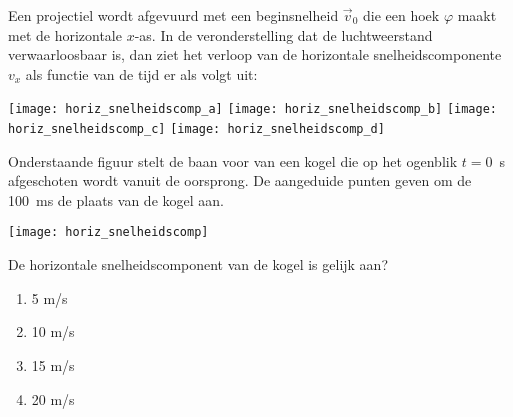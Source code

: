 \begin{exercise} Een projectiel wordt afgevuurd met een beginsnelheid
$\vec{v}_0$ die een hoek $\varphi$ maakt met de horizontale
\mbox{$x$-as}.
In de veronderstelling dat de luchtweerstand verwaarloosbaar is, dan
ziet het verloop van de horizontale snelheidscomponente $v_x$ als
functie van de tijd er als volgt uit:
\begin{flushright}
\texttt{[image: horiz\_snelheidscomp\_a]}
\texttt{[image: horiz\_snelheidscomp\_b]}
\texttt{[image: horiz\_snelheidscomp\_c]}
\texttt{[image: horiz\_snelheidscomp\_d]}
\end{flushright}

\end{exercise}

\begin{exercise} Onderstaande figuur stelt de baan voor van
een kogel die op het ogenblik \mbox{$t=0$~s} afgeschoten wordt
vanuit de oorsprong. De aangeduide punten geven om de \mbox{100 ms}
de plaats van de kogel aan.
\begin{center}
\texttt{[image: horiz\_snelheidscomp]}
\end{center}


De horizontale snelheidscomponent van de kogel is gelijk aan?
\begin{enumerate}
\item 5 m/s
\item 10 m/s
\item 15 m/s
\item 20 m/s
\end{enumerate}

\end{exercise}

